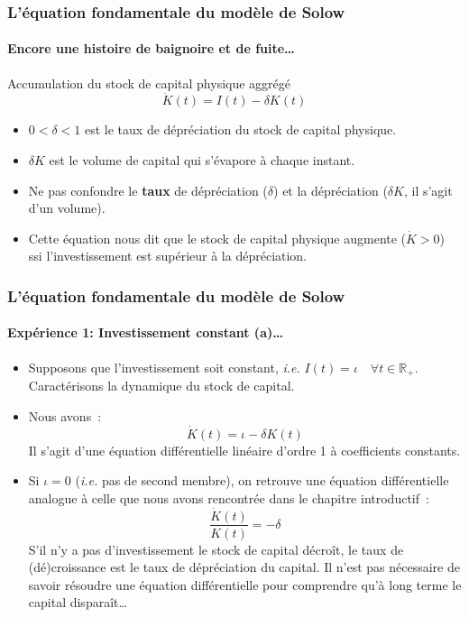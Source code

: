 \documentclass[10pt,notheorems]{beamer}
\theoremstyle{plain}
\theoremstyle{definition} %
\begin{document}
\begin{frame}
  \frametitle{L'équation fondamentale du modèle de Solow}
  \framesubtitle{Encore une histoire de baignoire et de fuite\ldots}

  \begin{block}{Accumulation du stock de capital physique aggrégé}
    \[
      \dot K(t) = I(t) - \delta K(t)
    \]
  \end{block}

  \bigskip

  \begin{itemize}

  \item $0<\delta<1$ est le taux de dépréciation du stock de capital physique.\newline

  \item $\delta K$ est le volume de capital qui s'évapore à chaque instant.\newline

  \item[\dbend] Ne pas confondre le \textbf{taux} de dépréciation ($\delta$) et la dépréciation ($\delta K$, il s'agit d'un volume).\newline

  \item Cette équation nous dit que le stock de capital physique augmente ($\dot K > 0$) ssi l'investissement est supérieur à la dépréciation.
  \end{itemize}

\end{frame}


\begin{frame}
  \frametitle{L'équation fondamentale du modèle de Solow}
  \framesubtitle{Expérience 1: Investissement constant (a)\ldots}

  \bigskip

  \begin{itemize}

  \item Supposons que l'investissement soit constant, \emph{i.e.} $I(t)=\iota\quad\forall t\in\mathbb R_+$. Caractérisons la dynamique du stock de capital.\newline

  \item Nous avons~:
    \[
      \dot K(t) = \iota - \delta K(t)
    \]
    Il s'agit d'une équation différentielle linéaire d'ordre 1 à
    coefficients constants.\newline

  \item Si $\iota=0$ (\emph{i.e.} pas de second membre), on retrouve une équation différentielle analogue à celle que nous avons rencontrée dans le chapitre introductif~:
    \[
      \frac{\dot K(t)}{K(t)} = -\delta
    \]
    S'il n'y a pas d'investissement le stock de capital décroît, le taux de (dé)croissance est le taux de dépréciation du capital. Il n'est pas nécessaire de savoir résoudre une équation différentielle pour comprendre qu'à long terme le capital disparaît\ldots

  \end{itemize}

\end{frame}
\end{document}
